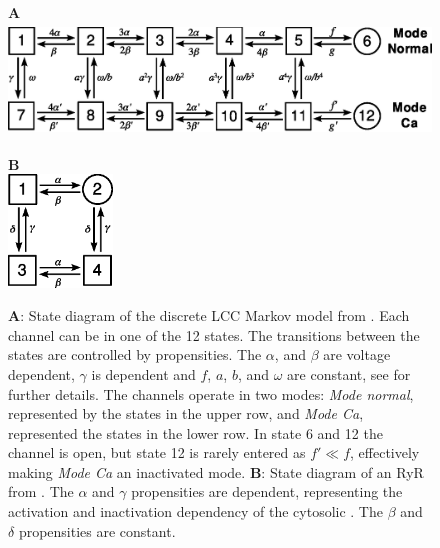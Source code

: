 \renewcommand{\figheight}{3cm}
\begin{figure}[t]
  \centering
  \begin{minipage}{0.79\linewidth}
     \large \textbf{A}\\[0.5em]
    \includegraphics[height=\figheight]{chapters/hake/eps/Jafri_1998_LCC_model}
  \end{minipage}
  \begin{minipage}{0.2\linewidth}
     \large \textbf{B}\\[0.5em]
    \includegraphics[height=\figheight]{chapters/hake/eps/Stern_1999_RyR_model}
  \end{minipage}
\caption{\textbf{A}: State diagram of the discrete LCC Markov model from \citet{JafriRiceEtAl1998}. Each channel can be in one of the 12 states.  The transitions between the states are controlled by propensities. The $\alpha$, and $\beta$ are voltage dependent, $\gamma$ is \CaC dependent and $f$, $a$, $b$, and $\omega$ are constant, see \citet{JafriRiceEtAl1998} for further details. The channels operate in two modes: \textit{Mode normal}, represented by the states in the upper row, and \textit{Mode Ca}, represented the states in the lower row. In state 6 and 12 the channel is open, but state 12 is rarely entered as $f'\ll{}f$, effectively making \textit{Mode Ca} an inactivated mode.
\textbf{B}: State diagram of an RyR from \citet{SternSongEtAl1999}. The $\alpha$ and $\gamma$ propensities are \Ca dependent, representing the activation and inactivation dependency of the cytosolic \CaC. The $\beta$ and $\delta$ propensities are constant.}
\label{fig:markov-models}
\end{figure}

